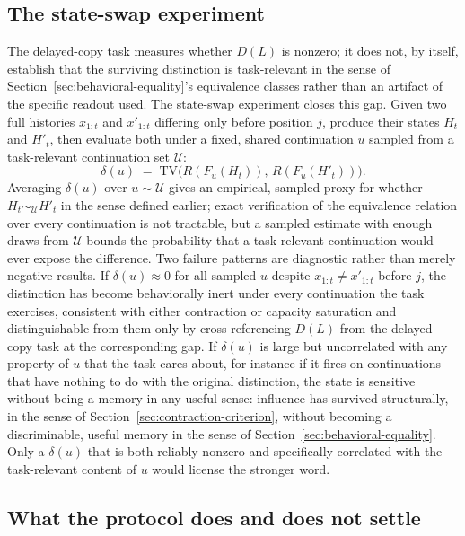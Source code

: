 \documentclass[11pt]{article}
\begin{document}
\subsection{The state-swap experiment}

The delayed-copy task measures whether $D(L)$ is nonzero; it does not, by itself, establish that the surviving distinction is task-relevant in the sense of Section~\ref{sec:behavioral-equality}'s equivalence classes rather than an artifact of the specific readout used. The state-swap experiment closes this gap. Given two full histories $x_{1:t}$ and $x'_{1:t}$ differing only before position $j$, produce their states $H_t$ and $H'_t$, then evaluate both under a fixed, shared continuation $u$ sampled from a task-relevant continuation set $\mathcal U$:
\[
\delta(u) \;=\; \mathrm{TV}\big(R(F_u(H_t)),\, R(F_u(H'_t))\big).
\]
Averaging $\delta(u)$ over $u \sim \mathcal U$ gives an empirical, sampled proxy for whether $H_t \sim_{\mathcal U} H'_t$ in the sense defined earlier; exact verification of the equivalence relation over every continuation is not tractable, but a sampled estimate with enough draws from $\mathcal U$ bounds the probability that a task-relevant continuation would ever expose the difference. Two failure patterns are diagnostic rather than merely negative results. If $\delta(u) \approx 0$ for all sampled $u$ despite $x_{1:t} \ne x'_{1:t}$ before $j$, the distinction has become behaviorally inert under every continuation the task exercises, consistent with either contraction or capacity saturation and distinguishable from them only by cross-referencing $D(L)$ from the delayed-copy task at the corresponding gap. If $\delta(u)$ is large but uncorrelated with any property of $u$ that the task cares about, for instance if it fires on continuations that have nothing to do with the original distinction, the state is sensitive without being a memory in any useful sense: influence has survived structurally, in the sense of Section~\ref{sec:contraction-criterion}, without becoming a discriminable, useful memory in the sense of Section~\ref{sec:behavioral-equality}. Only a $\delta(u)$ that is both reliably nonzero and specifically correlated with the task-relevant content of $u$ would license the stronger word.

\subsection{What the protocol does and does not settle}
\end{document}
